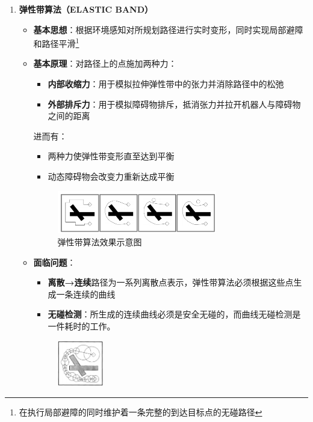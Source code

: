 \documentclass[../main.tex]{subfiles}
\begin{document}
\begin{enumerate}
\begin{itemize}
        \end{itemize}
    \item \textbf{弹性带算法（ELASTIC BAND）}
        \begin{itemize}
            \item \textbf{基本思想}：根据环境感知对所规划路径进行实时变形，同时实现局部避障和路径平滑\footnote{在执行局部避障的同时维护着一条完整的到达目标点的无碰路径}
            \item \textbf{基本原理}：对路径上的点施加两种力：
                \begin{itemize}
                    \item \textbf{内部收缩力}：用于模拟拉伸弹性带中的张力并消除路径中的松弛
                    \item \textbf{外部排斥力}：用于模拟障碍物排斥，抵消张力并拉开机器人与障碍物之间的距离
                \end{itemize}
                进而有：
                \begin{itemize}
                    \item 两种力使弹性带变形直至达到平衡
                    \item 动态障碍物会改变力重新达成平衡
                \end{itemize}
                    \begin{figure}[H]
                        \centering
                        \includegraphics[width=0.7\textwidth]{images/tanxingdai.png}
                        \caption{弹性带算法效果示意图}
                    \end{figure}
            \item \textbf{面临问题}：
                \begin{itemize}
                    \item \textbf{离散→连续}路径为一系列离散点表示，弹性带算法必须根据这些点生成一条连续的曲线
                    \item \textbf{无碰检测}：所生成的连续曲线必须是安全无碰的，而曲线无碰检测是一件耗时的工作。
                \end{itemize}
                    \begin{figure}[H]
                        \centering
                        \includegraphics[width=0.2\textwidth]{images/BUBBLE.png}

\end{figure}
\end{itemize}
\end{enumerate}
\end{document}
